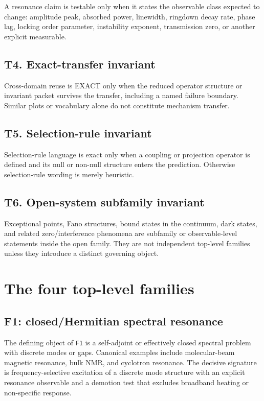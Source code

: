 \documentclass[aps,pra,reprint,nofootinbib]{revtex4-2}
\begin{document}
A resonance claim is testable only when it states the observable class expected to change: amplitude peak, absorbed power, linewidth, ringdown decay rate, phase lag, locking order parameter, instability exponent, transmission zero, or another explicit measurable.

\subsection*{T4. Exact-transfer invariant}

Cross-domain reuse is EXACT only when the reduced operator structure or invariant packet survives the transfer, including a named failure boundary. Similar plots or vocabulary alone do not constitute mechanism transfer.

\subsection*{T5. Selection-rule invariant}

Selection-rule language is exact only when a coupling or projection operator is defined and its null or non-null structure enters the prediction. Otherwise selection-rule wording is merely heuristic.

\subsection*{T6. Open-system subfamily invariant}

Exceptional points, Fano structures, bound states in the continuum, dark states, and related zero/interference phenomena are subfamily or observable-level statements inside the open family. They are not independent top-level families unless they introduce a distinct governing object.

\section{The four top-level families}

\subsection{F1: closed/Hermitian spectral resonance}

The defining object of \texttt{F1} is a self-adjoint or effectively closed spectral problem with discrete modes or gaps. Canonical examples include molecular-beam magnetic resonance, bulk NMR, and cyclotron resonance. The decisive signature is frequency-selective excitation of a discrete mode structure with an explicit resonance observable and a demotion test that excludes broadband heating or non-specific response.
\end{document}
